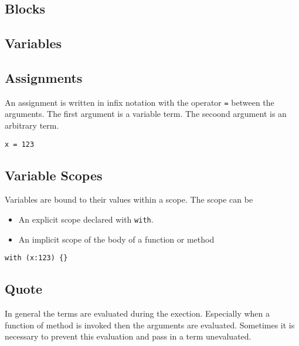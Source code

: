 \documentclass[11pt,a4paper]{scrbook}
\newcommand\keyword[1]{\texttt{#1}}
\begin{document}

\subsection{Blocks}


\subsection{Variables}


\subsection{Assignments}

An assignment is written in infix notation with the operator \keyword{=}
between the arguments. The first argument is a variable term. The secoond
argument is an arbitrary term.


\begin{lstlisting}[language=BibTool]
x = 123
\end{lstlisting}

\subsection{Variable Scopes}

Variables are bound to their values within a scope. The scope can be

\begin{itemize}
\item An explicit scope declared with \keyword{with}.
\item An implicit scope of the body of a function or method
\end{itemize}



\begin{lstlisting}[language=BibTool]
with (x:123) {}
\end{lstlisting}

\subsection{Quote}

In general the terms are evaluated during the exection. Especially when a
function of method is invoked then the arguments are evaluated. Sometimes it
is necessary to prevent this evaluation and pass in a term unevaluated.
\end{document}
